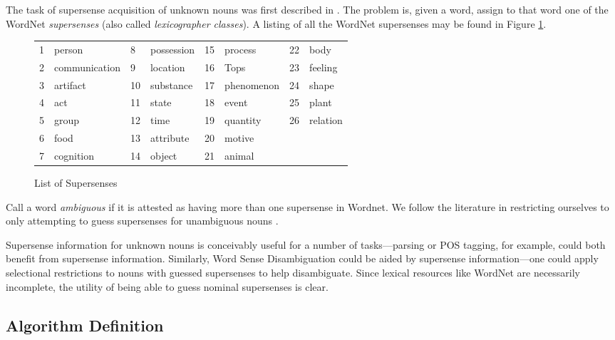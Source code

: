 \documentclass{article}
\begin{document}

The task of supersense acquisition of unknown nouns was first described in \cite{cj}.
The problem is, given a word,  assign to that word one of the WordNet {\it supersenses} (also called {\it lexicographer classes}).
A listing of all the WordNet supersenses may be found in Figure \ref{fig:supersenses}.
\begin{center}
\begin{figure}[hbtp]
\begin{tabular}{llllllll}
1& person & 8& possession&  15& process&  22& body \\
2& communication & 9& location& 16& Tops&  23& feeling \\
3& artifact & 10& substance&  17& phenomenon& 24& shape \\
4& act & 11& state& 18& event&  25& plant \\
5& group & 12& time& 19& quantity&  26& relation \\
6& food & 13&  attribute& 20& motive \\
7& cognition& 14& object& 21& animal \\
\end{tabular}
\caption{List of Supersenses}
\label{fig:supersenses}
\end{figure}
\end{center}

Call a word {\it ambiguous} if it is attested as having more than one supersense in Wordnet.
We follow the literature in restricting ourselves to only attempting to guess supersenses for unambiguous nouns \cite{cj}\cite{curran}.

Supersense information for unknown nouns is conceivably useful for a number of tasks---parsing or POS tagging, for example, could both benefit from supersense information.
Similarly, Word Sense Disambiguation could be aided by supersense information---one could apply selectional restrictions to nouns with guessed supersenses to help disambiguate.
Since lexical resources like WordNet are necessarily incomplete, the utility of being able to guess nominal supersenses is clear.



\subsection{Algorithm Definition}
\label{sec:alg}
\end{document}

